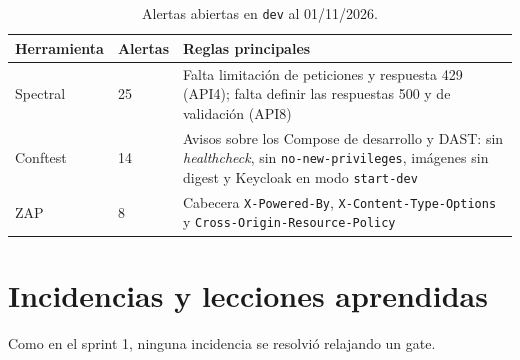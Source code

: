 \documentclass[11pt,a4paper]{report}
\begin{document}
\begin{table}[H]
\centering
\caption{Alertas abiertas en \texttt{dev} al 01/11/2026.}
\begin{tabularx}{\textwidth}{@{}P{2.2cm}P{1.4cm}L@{}}
\toprule
\textbf{Herramienta} & \textbf{Alertas} & \textbf{Reglas principales}\\
\midrule
Spectral & 25 & Falta limitación de peticiones y respuesta 429 (API4); falta definir las respuestas 500 y de validación (API8)\\
Conftest & 14 & Avisos sobre los Compose de desarrollo y DAST: sin \emph{healthcheck}, sin \texttt{no-new-privileges}, imágenes sin digest y Keycloak en modo \texttt{start-dev}\\
ZAP & 8 & Cabecera \texttt{X-Powered-By}, \texttt{X-Content-Type-Options} y \texttt{Cross-Origin-Resource-Policy}\\
\bottomrule
\end{tabularx}
\end{table}

\chapter{Incidencias y lecciones aprendidas}\label{cap:incidencias}

Como en el sprint 1, ninguna incidencia se resolvió relajando un gate.
\end{document}
